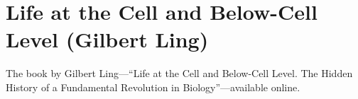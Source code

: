 \chapter{Life at the Cell and Below-Cell Level (Gilbert Ling)}

\begin{refsection}

The book by Gilbert Ling---\enquote{Life at the Cell and Below-Cell Level. The Hidden History of a Fundamental Revolution in Biology}---available online.\textsuperscript{\cite{urlddcf521f}}

\printbibliography[heading=subbibliography]

\end{refsection}